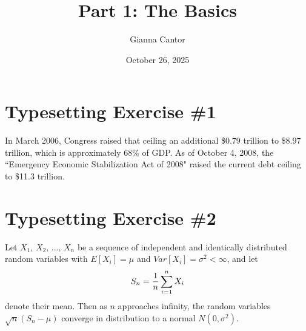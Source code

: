 \documentclass{article}
\title{Part 1: The Basics}
\author{Gianna Cantor}
\date{October 26, 2025}
\begin{document}
\maketitle

\section{Typesetting Exercise \#1}
In March 2006, Congress raised that ceiling an additional \$0.79 trillion to \$8.97 trillion, which is approximately 68\% of GDP. As of October 4, 2008, the ``Emergency Economic Stabilization Act of 2008" raised the current debt ceiling to \$11.3 trillion.

\section{Typesetting Exercise \#2}
Let $X_1$, $X_2$, ..., $X_n$ be a sequence of independent and identically distributed random variables with $E[X_i]=\mu$ and $Var[X_i]=\sigma^2<\infty$, and let
\begin{equation*}
    \centering
    S_n = \frac{1}{n} \sum_{i=1}^{n} X_i
\end{equation*}
denote their mean. Then as $n$ approaches infinity, the random variables $\sqrt{n}(S_n-\mu)$ converge in distribution to a normal $N(0, \sigma^2).$
\end{document}
